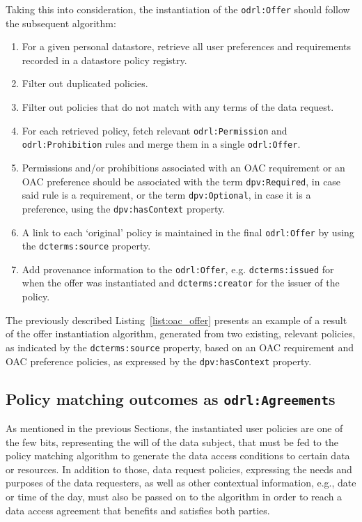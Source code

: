 Taking this into consideration, the instantiation of the \texttt{odrl:Offer} should follow the subsequent algorithm:
\begin{enumerate}
    \item For a given personal datastore, retrieve all user preferences and requirements recorded in a datastore policy registry.
    \item Filter out duplicated policies.
    \item Filter out policies that do not match with any terms of the data request.
    \item For each retrieved policy, fetch relevant \texttt{odrl:Permission} and \texttt{odrl:Prohibition} rules and merge them in a single \texttt{odrl:Offer}.
    \item Permissions and/or prohibitions associated with an OAC requirement or an OAC preference should be associated with the term \texttt{dpv:Required}, in case said rule is a requirement, or the term \texttt{dpv:Optional}, in case it is a preference, using the \texttt{dpv:hasContext} property.
    \item A link to each `original' policy is maintained in the final \texttt{odrl:Offer} by using the \texttt{dcterms:source} property.
    \item Add provenance information to the \texttt{odrl:Offer}, e.g. \texttt{dcterms:issued} for when the offer was instantiated and \texttt{dcterms:creator} for the issuer of the policy.
\end{enumerate}

The previously described Listing~\ref{list:oac_offer} presents an example of a result of the offer instantiation algorithm, generated from two existing, relevant policies, as indicated by the \texttt{dcterms:source} property, based on an OAC requirement and OAC preference policies, as expressed by the \texttt{dpv:hasContext} property.

\subsection{Policy matching outcomes as \texttt{odrl:Agreement}s}
\label{sec:algorithm-agreement}

As mentioned in the previous Sections, the instantiated user policies are one of the few bits, representing the will of the data subject, that must be fed to the policy matching algorithm to generate the data access conditions to certain data or resources.
In addition to those, data request policies, expressing the needs and purposes of the data requesters, as well as other contextual information, e.g., date or time of the day, must also be passed on to the algorithm in order to reach a data access agreement that benefits and satisfies both parties.

